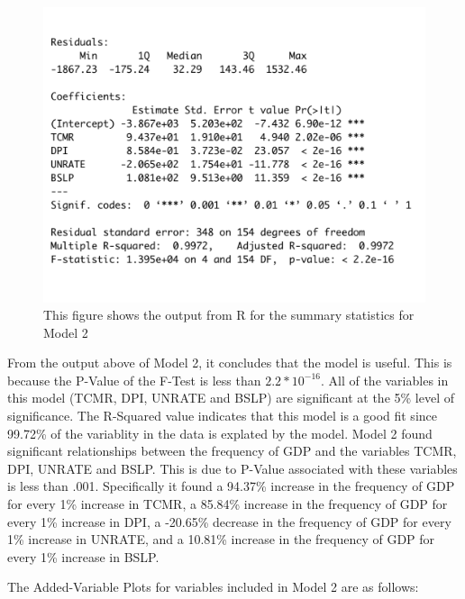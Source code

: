 \documentclass[12pt]{article}
\begin{document}
\begin{figure}[H]
  \centering
  \includegraphics[scale = .5]{mod2output}
  \caption{This figure shows the output from R for the summary statistics for Model 2}
\end{figure}

From the output above of Model 2, it concludes that the model is useful.
This is because the P-Value of the F-Test is less than $2.2 * 10^{-16}$.
All of the variables in this model (TCMR, DPI, UNRATE and BSLP) are significant at the 5\% level of significance.
The R-Squared value indicates that this model is a good fit since 99.72\% of the variablity in the data is explated by the model. 
Model 2 found significant relationships between the frequency of GDP and the variables TCMR, DPI, UNRATE and BSLP. 
This is due to P-Value associated with these variables is less than .001. 
Specifically it found a 94.37\% increase in the frequency of GDP for every 1\% increase in TCMR, a 85.84\% increase in the frequency of GDP for every 1\% increase in DPI, a -20.65\% decrease in the frequency of GDP for every 1\% increase in UNRATE, and a 10.81\% increase in the frequency of GDP for every 1\% increase in BSLP.

The Added-Variable Plots for variables included in Model 2 are as follows: 
\end{document}
